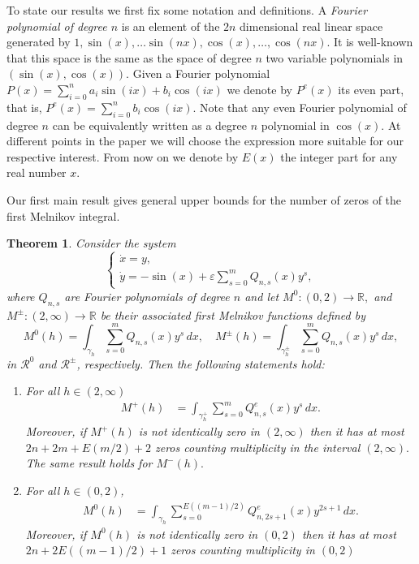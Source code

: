 \documentclass[12pt,psamsfonts]{amsart}
\newtheorem{thmx}{Theorem}
\begin{document}
To state our results we first fix some notation and definitions. A {\em Fourier polynomial of
degree $n$} is an element of the $2n$ dimensional real linear space generated by
$1,\sin(x),\ldots\sin(nx), \cos(x),\ldots,\cos(nx).$ It is well-known that this space is the same
as the space of degree $n$ two variable polynomials in $(\sin(x),\cos(x)).$ Given a Fourier
polynomial $P(x)=\sum_{i=0}^na_i\sin(ix)+b_i\cos(ix)$ we denote by $P^e(x)$ its even part, that
is, $P^e(x)=\sum_{i=0}^nb_i\cos(ix).$ Note that any even Fourier polynomial of degree $n$ can be
equivalently written as a degree $n$ polynomial in $\cos(x).$ At different points in the paper we
will choose the expression more suitable for our respective interest. From now on we denote by
$E(x)$ the integer part for any real number $x$.

Our first main result gives general upper bounds for the number of zeros of the first Melnikov
integral.

\begin{thmx}
\label{T-thm bounds}
 Consider the system
    \begin{equation}
      \label{E-penduSysGen}
           {
  \left\{\!
   \begin{array}{l}
    \dot x={y,} \\[2pt] \dot y={-\sin( x)+ {\varepsilon} \sum_{{s}=0}^{m}Q_{n,{s}}(x) y^{s},}
   \end{array}
  \right.
}
     \end{equation}
where  $Q_{n,{s}}$ are Fourier polynomials of degree $n$ and let
$M^0:(0,2)\longrightarrow {\mathbb{R}},$ and $M^{\pm}:(2,\infty)\longrightarrow
{\mathbb{R}}$ be their associated first Melnikov functions defined  by
\[
 M^0(h)  = \int_{{\gamma}_h} \sum_{{s}=0}^{m}Q_{n,{s}}(x) y^{s}\, dx,\quad M^{\pm }(h)
  = \int_{{\gamma}_h^{\pm}} \sum_{{s}=0}^{m}Q_{n,{s}}(x)
 y^{s}\, dx,
\]
 in $\mathcal {R}^0$ and $\mathcal {R}^\pm$, respectively. Then the
following statements hold:
\begin{enumerate}

\item[(a)]For all $h\in(2,\infty)$ \begin{align*}
    M^+(h)  &= \int_{{\gamma}_h^+} \sum_{{s}=0}^{m}Q^e_{n,{s}}(x) y^{s} \, dx.
\end{align*}
 Moreover, if $M^+(h)$ is not identically zero in $(2,\infty)$ then it has at most
 $2n + 2m + E\left ({m}/{2}\right)+2$ zeros  counting
multiplicity in the interval $(2,\infty).$ The same result holds
    for $M^-(h).$

    \item[(b)] For all $h\in(0,2)$,
        \begin{align*}
            M^0(h) &=  \int_{{\gamma}_h} \sum_{{s}=0}^{E((m-1)/{2})}Q^e_{n,2{s}+1}(x)
            y^{2{s}+1} \, dx.
        \end{align*}
        Moreover, if $M^0(h)$ is not identically zero in $(0,2)$ then it has at
most $2n +2E({(m-1)}/{2}) + 1$ zeros counting multiplicity in  $(0,2)$
\end{enumerate}
\end{thmx}
\end{document}
